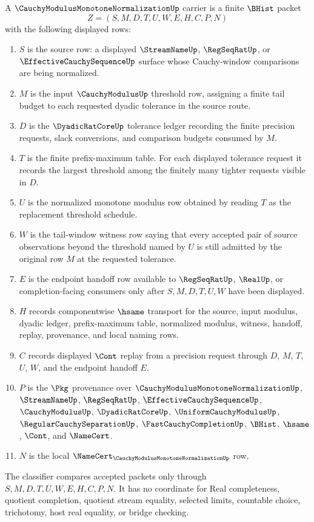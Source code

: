 \begin{definition}
\label{def:cauchy-modulus-monotone-normalization-carrier}
A $\CauchyModulusMonotoneNormalizationUp$ carrier is a finite $\BHist$ packet
$$
Z=(S,M,D,T,U,W,E,H,C,P,N)
$$
with the following displayed rows:
\begin{enumerate}
\item $S$ is the source row: a displayed $\StreamNameUp$, $\RegSeqRatUp$, or $\EffectiveCauchySequenceUp$ surface whose Cauchy-window comparisons are being normalized.
\item $M$ is the input $\CauchyModulusUp$ threshold row, assigning a finite tail budget to each requested dyadic tolerance in the source route.
\item $D$ is the $\DyadicRatCoreUp$ tolerance ledger recording the finite precision requests, slack conversions, and comparison budgets consumed by $M$.
\item $T$ is the finite prefix-maximum table. For each displayed tolerance request it records the largest threshold among the finitely many tighter requests visible in $D$.
\item $U$ is the normalized monotone modulus row obtained by reading $T$ as the replacement threshold schedule.
\item $W$ is the tail-window witness row saying that every accepted pair of source observations beyond the threshold named by $U$ is still admitted by the original row $M$ at the requested tolerance.
\item $E$ is the endpoint handoff row available to $\RegSeqRatUp$, $\RealUp$, or completion-facing consumers only after $S,M,D,T,U,W$ have been displayed.
\item $H$ records componentwise $\hsame$ transport for the source, input modulus, dyadic ledger, prefix-maximum table, normalized modulus, witness, handoff, replay, provenance, and local naming rows.
\item $C$ records displayed $\Cont$ replay from a precision request through $D$, $M$, $T$, $U$, $W$, and the endpoint handoff $E$.
\item $P$ is the $\Pkg$ provenance over $\CauchyModulusMonotoneNormalizationUp$, $\StreamNameUp$, $\RegSeqRatUp$, $\EffectiveCauchySequenceUp$, $\CauchyModulusUp$, $\DyadicRatCoreUp$, $\UniformCauchyModulusUp$, $\RegularCauchySeparationUp$, $\FastCauchyCompletionUp$, $\BHist$, $\hsame$, $\Cont$, and $\NameCert$.
\item $N$ is the local $\NameCert_{\CauchyModulusMonotoneNormalizationUp}$ row.
\end{enumerate}
The classifier compares accepted packets only through $S,M,D,T,U,W,E,H,C,P,N$. It has no coordinate for Real completeness, quotient completion, quotient stream equality, selected limits, countable choice, trichotomy, host real equality, or bridge checking.
\end{definition}

